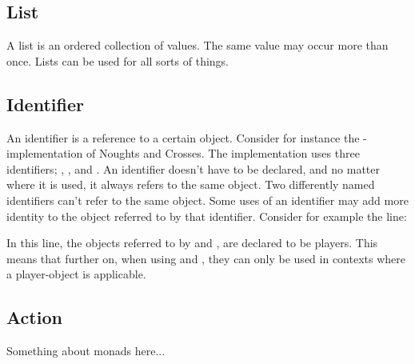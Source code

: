 \subsection{List}
A list is an ordered collection of values. The same value may occur more than once. 
Lists can be used for all sorts of things.

\subsection{Identifier}
An identifier is a reference to a certain object. Consider for instance the \productname-implementation
of Noughts and Crosses. The implementation uses three identifiers; ,
, and . An identifier doesn't have to be declared, and no matter
where it is used, it always refers to the same object. Two differently named identifiers can't refer
to the same object. Some uses of an identifier may add more identity to the object referred to by that
identifier. Consider for example the line:


In this line, the objects referred to by  and , are declared
to be players. This means that further on, when using  and ,
they can only be used in contexts where a player-object is applicable.


\subsection{Action}

Something about monads here...
